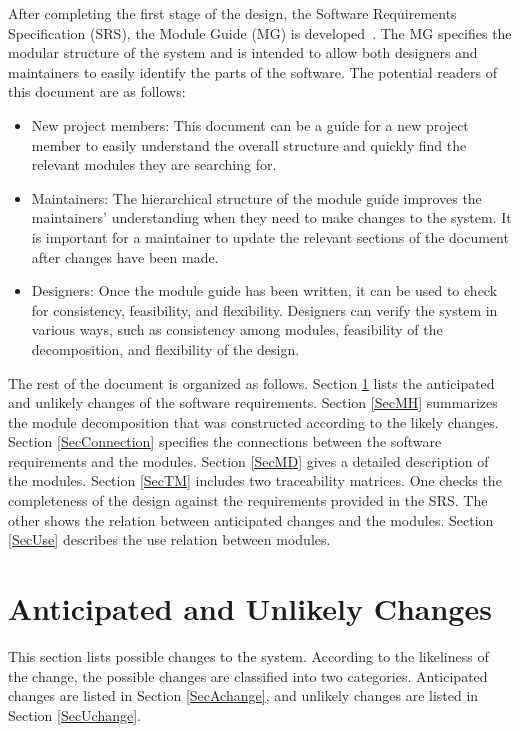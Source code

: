 \documentclass[12pt, titlepage]{article}
\begin{document}
After completing the first stage of the design, the Software Requirements
Specification (SRS), the Module Guide (MG) is developed~\citep{ParnasEtAl1984}. The MG
specifies the modular structure of the system and is intended to allow both
designers and maintainers to easily identify the parts of the software.  The
potential readers of this document are as follows:

\begin{itemize}
\item New project members: This document can be a guide for a new project member
  to easily understand the overall structure and quickly find the
  relevant modules they are searching for.
\item Maintainers: The hierarchical structure of the module guide improves the
  maintainers' understanding when they need to make changes to the system. It is
  important for a maintainer to update the relevant sections of the document
  after changes have been made.
\item Designers: Once the module guide has been written, it can be used to
  check for consistency, feasibility, and flexibility. Designers can verify the
  system in various ways, such as consistency among modules, feasibility of the
  decomposition, and flexibility of the design.
\end{itemize}

The rest of the document is organized as follows. Section
\ref{SecChange} lists the anticipated and unlikely changes of the software
requirements. Section \ref{SecMH} summarizes the module decomposition that
was constructed according to the likely changes. Section \ref{SecConnection}
specifies the connections between the software requirements and the
modules. Section \ref{SecMD} gives a detailed description of the
modules. Section \ref{SecTM} includes two traceability matrices. One checks
the completeness of the design against the requirements provided in the SRS. The
other shows the relation between anticipated changes and the modules. Section
\ref{SecUse} describes the use relation between modules.

\section{Anticipated and Unlikely Changes} \label{SecChange}

This section lists possible changes to the system. According to the likeliness
of the change, the possible changes are classified into two
categories. Anticipated changes are listed in Section \ref{SecAchange}, and
unlikely changes are listed in Section \ref{SecUchange}.
\end{document}
